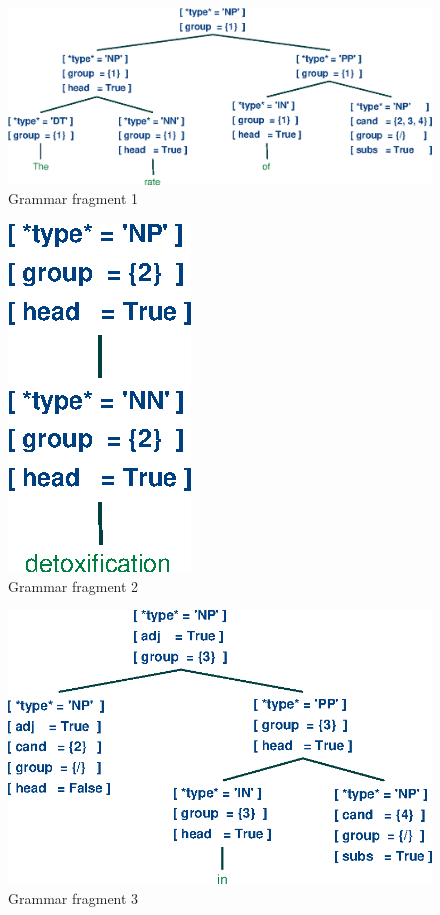 \documentclass[a4paper]{article}
\begin{document}
\begin{figure}[h]
    \begin{center}
        \includegraphics[scale=0.5]{1.eps}
    \end{center}
    \caption{Grammar fragment 1}
\end{figure}
\begin{figure}[h]
    \begin{center}
        \includegraphics[scale=0.5]{2.eps}
    \end{center}
    \caption{Grammar fragment 2}
\end{figure}
\begin{figure}[h]
    \begin{center}
        \includegraphics[scale=0.5]{3.eps}
    \end{center}
    \caption{Grammar fragment 3}
\end{figure}
\end{document}
